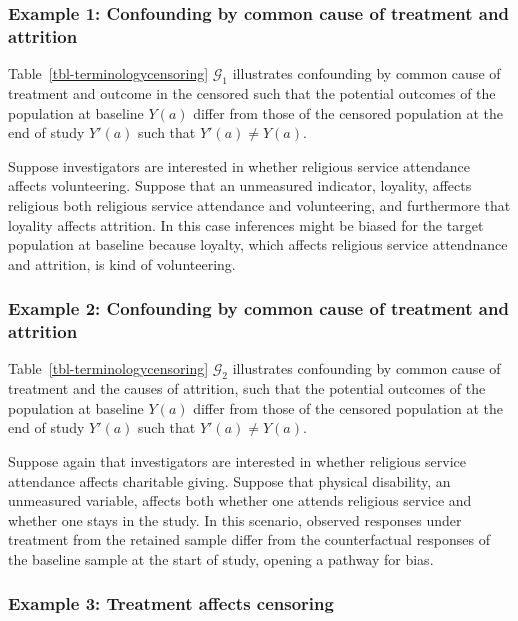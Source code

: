 \documentclass[
  single column]{article}
\begin{document}
\subsubsection{Example 1: Confounding by common cause of treatment and
attrition}\label{example-1-confounding-by-common-cause-of-treatment-and-attrition}

Table~\ref{tbl-terminologycensoring} \(\mathcal{G}_1\) illustrates
confounding by common cause of treatment and outcome in the censored
such that the potential outcomes of the population at baseline \(Y(a)\)
differ from those of the censored population at the end of study
\(Y'(a)\) such that \(Y'(a) \neq Y(a)\).

Suppose investigators are interested in whether religious service
attendance affects volunteering. Suppose that an unmeasured indicator,
loyality, affects religious both religious service attendance and
volunteering, and furthermore that loyality affects attrition. In this
case inferences might be biased for the target population at baseline
because loyalty, which affects religious service attendnance and
attrition, is kind of volunteering.

\subsubsection{Example 2: Confounding by common cause of treatment and
attrition}\label{example-2-confounding-by-common-cause-of-treatment-and-attrition}

Table~\ref{tbl-terminologycensoring} \(\mathcal{G}_2\) illustrates
confounding by common cause of treatment and the causes of attrition,
such that the potential outcomes of the population at baseline \(Y(a)\)
differ from those of the censored population at the end of study
\(Y'(a)\) such that \(Y'(a) \neq Y(a)\).

Suppose again that investigators are interested in whether religious
service attendance affects charitable giving. Suppose that physical
disability, an unmeasured variable, affects both whether one attends
religious service and whether one stays in the study. In this scenario,
observed responses under treatment from the retained sample differ from
the counterfactual responses of the baseline sample at the start of
study, opening a pathway for bias.

\subsubsection{Example 3: Treatment affects
censoring}\label{example-3-treatment-affects-censoring}
\end{document}

